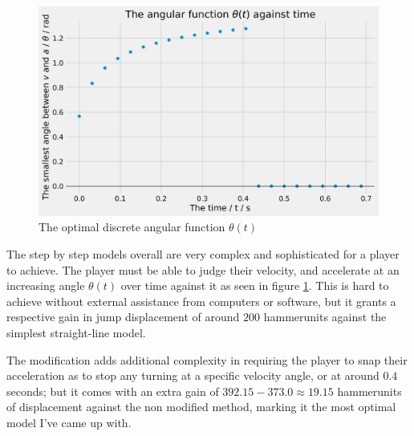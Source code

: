 \begin{figure}[H]
    \centering
    \includegraphics[width=0.8\linewidth]{assets/step_by_step_acc.png}
        \caption{The optimal discrete angular function $\theta(t)$}
        \label{fig:sbsa}
\end{figure}


The step by step models overall are very complex and sophisticated for a player to achieve. The player must be able to judge their velocity, and accelerate at an increasing angle $\theta(t)$ over time against it as seen in figure \ref{fig:sbsa}. This is hard to achieve without external assistance from computers or software, but it grants a respective gain in jump displacement of around $200$ hammerunits against the simplest straight-line model.

The modification adds additional complexity in requiring the player to snap their acceleration as to stop any turning at a specific velocity angle, or at around $0.4$ seconds; but it comes with an extra gain of $392.15-373.0\approx19.15$ hammerunits of displacement against the non modified method, marking it the most optimal model I've came up with.


